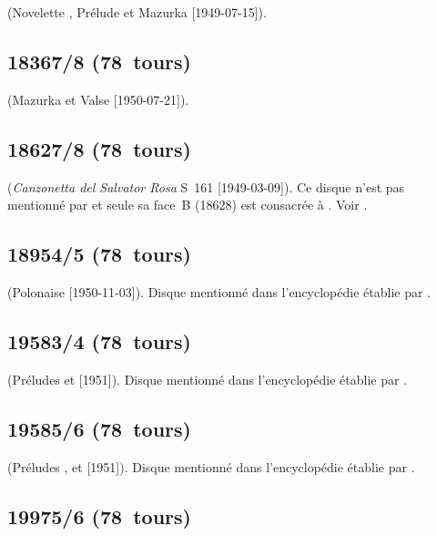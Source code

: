 \Liadov{} (Novelette , Prélude   et Mazurka
  [1949-07-15]).

\subsection{18367/8 (78~tours)}

\Chopin{} (Mazurka   et Valse  
[1950-07-21]).

\subsection{18627/8 (78~tours)}

\Liszt{} (\emph{Canzonetta del Salvator Rosa} S~161 
[1949-03-09]).
Ce disque n'est pas mentionné par \INikonovich{}
\citep[voir][]{Nikonovich11} et seule sa face~B (18628) est consacrée à
\VSofronitsky{}.
Voir \citet{Recordssu}.

\subsection{18954/5 (78~tours)}

\Scriabine{} (Polonaise  [1950-11-03]).
Disque mentionné dans l'encyclopédie établie par \citet[supplément~II,
p.~203]{CloughCuming}.

\subsection{19583/4 (78~tours)}

\Scriabine{} (Préludes   et   [1951]).
Disque mentionné dans l'encyclopédie établie par \citet[supplément~II,
p.~203]{CloughCuming}.

\subsection{19585/6 (78~tours)}

\Scriabine{} (Préludes  ,   et
  [1951]).
Disque mentionné dans l'encyclopédie établie par \citet[supplément~II,
p.~203]{CloughCuming}.

\subsection{19975/6 (78~tours)}

